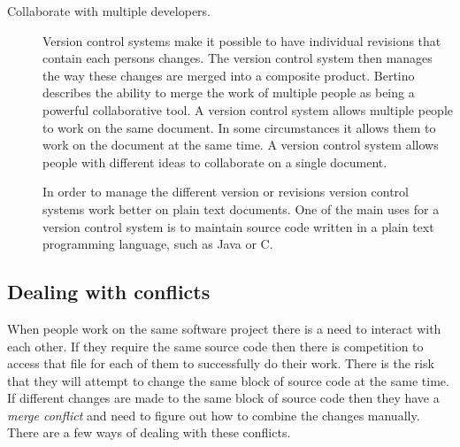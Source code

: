 \begin{description}
  \item [Collaborate with multiple developers.]
  Version control systems make it possible to have individual revisions that contain each persons changes. The version control system then manages the way these changes are merged into a composite product. Bertino \cite{Bertino2012} describes the ability to merge the work of multiple people as being a powerful collaborative tool. A version control system allows multiple people to work on the same document. In some circumstances it allows them to work on the document at the same time.  A version control system allows people with different ideas to collaborate on a single document.

  In order to manage the different version or revisions version control systems work better on plain text documents. One of the main uses for a version control system is to maintain source code written in a plain text programming language, such as Java or C.

\end{description}



\subsection{Dealing with conflicts}
When people work on the same software project there is a need to interact with each other.
If they require the same source code then there is competition to access that file for each of them to successfully do their work.
There is the risk that they will attempt to change the same block of source code at the same time.
If different changes are made to the same block of source code then they have a \emph{merge conflict} and need to figure out how to combine the changes manually.
There are a few ways of dealing with these conflicts.

